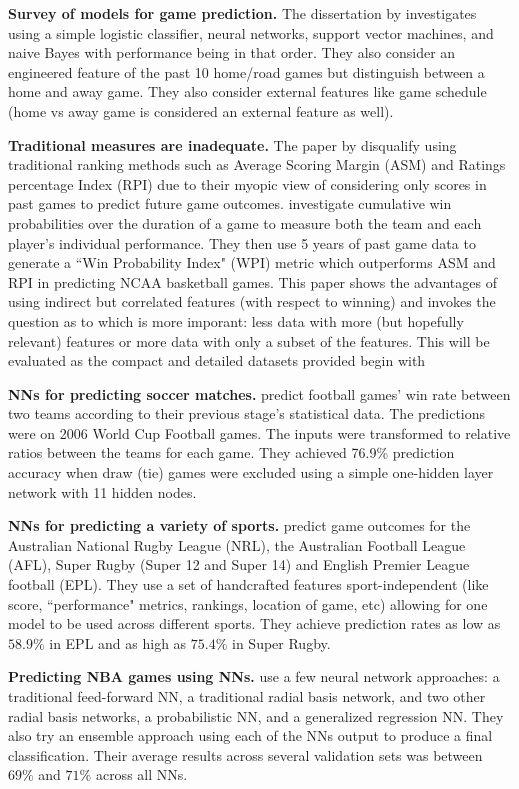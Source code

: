 \documentclass{article} %
\begin{document}
\textbf{Survey of models for game prediction.}
The dissertation by \citet{cao2012sports} investigates using a simple logistic classifier, neural networks, support vector machines, and naive Bayes with performance being in that order.
They also consider an engineered feature of the past 10 home/road games but distinguish between a home and away game.
They also consider external features like game schedule (home vs away game is considered an external feature as well).

\textbf{Traditional measures are inadequate.}
The paper by \citet{bashuk2012using} disqualify using traditional ranking methods such as Average Scoring Margin (ASM) and Ratings percentage Index (RPI) due to their myopic view of considering only scores in past games to predict future game outcomes.
\citet{bashuk2012using} investigate cumulative win probabilities over the duration of a game to measure both the team and each player's individual performance.
They then use 5 years of past game data to generate a ``Win Probability Index" (WPI) metric which outperforms ASM and RPI in predicting NCAA basketball games.
This paper shows the advantages of using indirect but correlated features (with respect to winning) and invokes the question as to which is more imporant: less data with more (but hopefully relevant) features or more data with only a subset of the features.
This will be evaluated as the compact and detailed datasets provided begin with


\textbf{NNs for predicting soccer matches.}
\citet{huang2010neural} predict football games' win rate between two teams according to their previous stage's statistical data.
The predictions were on 2006 World Cup Football games.
The inputs were transformed to relative ratios between the teams for each game.
They achieved 76.9\% prediction accuracy when draw (tie) games were excluded using a simple one-hidden layer network with 11 hidden nodes.

\textbf{NNs for predicting a variety of sports.}
\citet{mccabe2008artificial} predict game outcomes for the Australian National Rugby League (NRL), the Australian Football League (AFL), Super Rugby (Super 12 and Super 14) and English Premier League football (EPL).
They use a set of handcrafted features sport-independent (like score, ``performance" metrics, rankings, location of game, etc) allowing for one model to be used across different sports.
They achieve prediction rates as low as $58.9\%$ in EPL and as high as $75.4\%$ in Super Rugby.


\textbf{Predicting NBA games using NNs.}
\citet{loeffelholz2009predicting} use a few neural network approaches: a traditional feed-forward NN, a traditional radial basis network, and two other radial basis networks, a probabilistic NN, and a generalized regression NN.
They also try an ensemble approach using each of the NNs output to produce a final classification.
Their average results across several validation sets was between $69\%$ and $71\%$ across all NNs.
\end{document}
